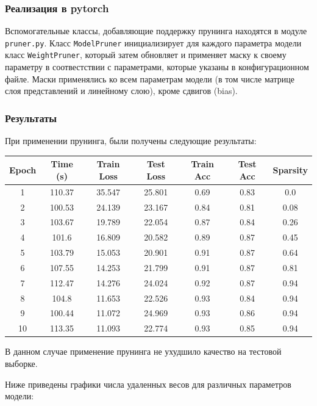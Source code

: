 \documentclass[12pt]{article}
\begin{document}
\subsubsection*{Реализация в pytorch}
Вспомогательные классы, добавляющие поддержку прунинга находятся в модуле
\texttt{pruner.py}. Класс \texttt{ModelPruner} инициализирует для каждого 
параметра модели класс \texttt{WeightPruner}, который затем обновляет и применяет
маску к своему параметру в соотвестствии с параметрами, которые указаны в 
конфигурационном файле. Маски применялись ко всем параметрам модели (в том числе матрице слоя 
представлений и линейному слою), кроме сдвигов (bias).

\subsubsection*{Результаты}
При применении прунинга, были получены следующие результаты:

\begin{center}
\begin{tabular}{ccccccc}
  \hline
  Epoch & Time (s) & Train Loss & Test Loss & Train Acc & Test Acc & Sparsity\\
  \hline
  1 & 110.37 & 35.547 & 25.801 & 0.69 & 0.83 & 0.0\\
  2 & 100.53 & 24.139 & 23.167 & 0.84 & 0.81 & 0.08\\
  3 & 103.67 & 19.789 & 22.054 & 0.87 & 0.84 & 0.26\\
  4 & 101.6 & 16.809 & 20.582 & 0.89 & 0.87 & 0.45\\
  5 & 103.79 & 15.053 & 20.901 & 0.91 & 0.87 & 0.64\\
  6 & 107.55 & 14.253 & 21.799 & 0.91 & 0.87 & 0.81\\
  7 & 112.47 & 14.276 & 24.024 & 0.92 & 0.87 & 0.94\\
  8 & 104.8 & 11.653 & 22.526 & 0.93 & 0.84 & 0.94\\
  9 & 100.44 & 11.072 & 24.969 & 0.93 & 0.86 & 0.94\\
  10 & 113.35 & 11.093 & 22.774 & 0.93 & 0.85 & 0.94\\
  \hline
\end{tabular}
\end{center}

В данном случае применение прунинга не ухудшило качество на тестовой выборке. 

\newpage

Ниже приведены графики числа удаленных весов для различных параметров модели:
\end{document}
